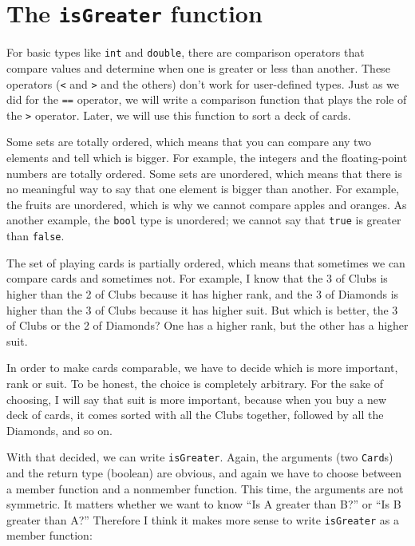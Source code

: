 \section{The {\tt isGreater} function}

For basic types like {\tt int} and {\tt double}, there are comparison
operators that compare values and determine when one is greater or
less than another.  These operators ({\tt <} and {\tt >} and the
others) don't work for user-defined types.  Just as we did for the
{\tt ==} operator, we will write a comparison function that plays
the role of the {\tt >} operator.  Later, we will use this function to
sort a deck of cards.


Some sets are totally ordered, which means that you can compare any
two elements and tell which is bigger.  For example, the integers and
the floating-point numbers are totally ordered.  Some sets are
unordered, which means that there is no meaningful way to say that one
element is bigger than another.  For example, the fruits are
unordered, which is why we cannot compare apples and oranges.  As
another example, the {\tt bool} type is unordered; we cannot say that
{\tt true} is greater than {\tt false}.

The set of playing cards is partially ordered, which means that
sometimes we can compare cards and sometimes not.  For example, I know
that the 3 of Clubs is higher than the 2 of Clubs because it has
higher rank, and the 3 of Diamonds is higher than the 3 of Clubs
because it has higher suit.  But which is better, the 3 of Clubs or
the 2 of Diamonds?  One has a higher rank, but the other has a higher
suit.


In order to make cards comparable, we have to decide which is more
important, rank or suit.  To be honest, the choice is completely
arbitrary.  For the sake of choosing, I will say that suit is more
important, because when you buy a new deck of cards, it comes sorted
with all the Clubs together, followed by all the Diamonds, and so on.

With that decided, we can write {\tt isGreater}.  Again, the arguments
(two {\tt Card}s) and the return type (boolean) are obvious, and again
we have to choose between a member function and a nonmember function.
This time, the arguments are not symmetric.  It matters whether we
want to know ``Is A greater than B?'' or ``Is B greater than A?''
Therefore I think it makes more sense to write {\tt isGreater} as a
member function:

